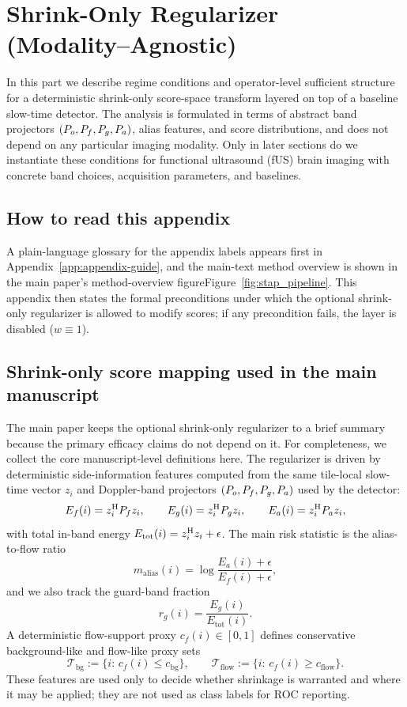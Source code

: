 \section{Shrink-Only Regularizer (Modality--Agnostic)}
\label{app:ka-contract-theory}

In this part we describe regime conditions and operator-level sufficient structure for a deterministic shrink-only score-space transform layered on top of a baseline slow-time detector. The analysis is formulated in terms of abstract band projectors $(P_o,P_f,P_g,P_a)$, alias features, and score distributions, and does not depend on any particular imaging modality. Only in later sections do we instantiate these conditions for functional ultrasound (fUS) brain imaging with concrete band choices, acquisition parameters, and baselines.

\subsection*{How to read this appendix}
A plain-language glossary for the appendix labels appears first in Appendix~\ref{app:appendix-guide}, and the main-text method overview is shown in \ifSUPPLEMENTONLY the main paper's method-overview figure\else Figure~\ref{fig:stap_pipeline}\fi. This appendix then states the formal preconditions under which the optional shrink-only regularizer is allowed to modify scores; if any precondition fails, the layer is disabled ($w\equiv 1$).

\subsection{Shrink-only score mapping used in the main manuscript}
The main paper keeps the optional shrink-only regularizer to a brief summary because the primary efficacy claims do not depend on it. For completeness, we collect the core manuscript-level definitions here. The regularizer is driven by deterministic side-information features computed from the same tile-local slow-time vector $z_i$ and Doppler-band projectors $(P_o,P_f,P_g,P_a)$ used by the detector:
\[
  E_f(i)=z_i^{\mathrm{H}} P_f z_i,\qquad
  E_g(i)=z_i^{\mathrm{H}} P_g z_i,\qquad
  E_a(i)=z_i^{\mathrm{H}} P_a z_i,
\]
with total in-band energy $E_{\mathrm{tot}}(i)=z_i^{\mathrm{H}} z_i+\epsilon$. The main risk statistic is the alias-to-flow ratio
\[
  m_{\mathrm{alias}}(i)=\log\frac{E_a(i)+\epsilon}{E_f(i)+\epsilon},
\]
and we also track the guard-band fraction
\[
  r_g(i)=\frac{E_g(i)}{E_{\mathrm{tot}}(i)}.
\]
A deterministic flow-support proxy $c_f(i)\in[0,1]$ defines conservative background-like and flow-like proxy sets
\[
  \mathcal{T}_{\mathrm{bg}}:=\{i:\,c_f(i)\le c_{\mathrm{bg}}\},\qquad
  \mathcal{T}_{\mathrm{flow}}:=\{i:\,c_f(i)\ge c_{\mathrm{flow}}\}.
\]
These features are used only to decide whether shrinkage is warranted and where it may be applied; they are not used as class labels for ROC reporting.

